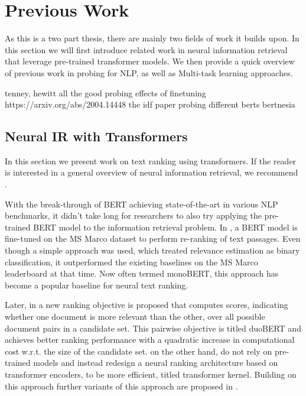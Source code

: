 \chapter{Previous Work}
\label{chap:prev}
As this is a two part thesis, there are mainly two fields of work it builds upon. In this section we will first introduce related work in neural information retrieval that leverage pre-trained transformer models. We then provide a quick overview of previous work in probing for NLP, as well as Multi-task learning approaches.

tenney, hewitt all the good probing
effects of finetuning https://arxiv.org/abs/2004.14448
the idf paper
probing different berts
bertnesia

\section{Neural IR with Transformers}
In this section we present work on text ranking using transformers. If the reader is interested in a general overview of neural information retrieval, we recommend \cite{mitra2018an, Onal2017NeuralIR, Guo2020ADL}.

With the break-through of BERT \cite{devlin-etal-2019-bert} achieving state-of-the-art in various NLP benchmarks, it didn't take long for researchers to also try applying the pre-trained BERT model to the information retrieval problem. In \cite{Nogueira2019PassageRW}, a BERT model is fine-tuned on the MS Marco dataset \cite{DBLP:journals/corr/NguyenRSGTMD16} to perform re-ranking of text passages. Even though a simple approach was used, which treated relevance estimation as binary classification, it outperformed the existing baselines on the MS Marco leaderboard at that time. Now often termed monoBERT, this approach has become a popular baseline for neural text ranking.

Later, in \cite{Nogueira2019MultiStageDR} a new ranking objective is proposed that computes scores, indicating whether one document is more relevant than the other, over all possible document pairs in a candidate set. This pairwise objective is titled duoBERT and achieves better ranking performance with a quadratic increase in computational cost w.r.t. the size of the candidate set. \cite{DBLP:journals/corr/abs-1912-01385} on the other hand, do not rely on pre-trained models and instead redesign a neural ranking architecture based on transformer encoders, to be more efficient, titled transformer kernel. Building on this approach further variants of this approach are proposed in \cite{Hofsttter2020LocalSO, 10.1145/3404835.3463049}.


